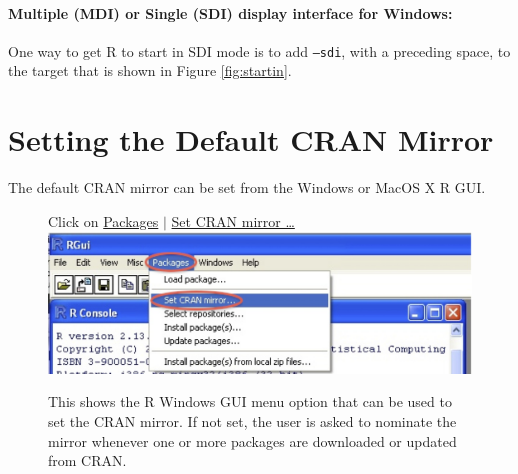 \paragraph{Multiple (MDI) or Single (SDI) display interface for Windows:}
One way to get R to start in SDI mode is to add \texttt{--sdi}, with a
preceding space, to the target that is shown in Figure
\ref{fig:startin}.

\section{Setting the Default CRAN Mirror}\label{sec:mirror}
The default CRAN mirror can be set from the Windows or MacOS X R GUI.\\[-3pt]

\begin{figure}[h]
 Click on \underline{Packages} $\mid$ \underline{Set CRAN mirror \ldots}\\[6pt]
\includegraphics{figs-inc/16i-win-mirrors.jpg}
\caption{This shows the R Windows GUI menu option that can be used to
  set the CRAN mirror.  If not set, the user is asked to nominate the
  mirror whenever one or more packages are downloaded or updated from
  CRAN.}
\end{figure}
\vspace*{-18pt}



